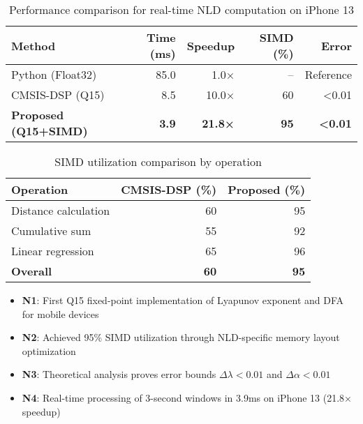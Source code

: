 \begin{table}[htbp]
\centering
\caption{Performance comparison for real-time NLD computation on iPhone 13}
\label{tab:performance}
\begin{tabular}{lrrrr}
\toprule
Method & Time (ms) & Speedup & SIMD (\%) & Error \\
\midrule
Python (Float32) & 85.0 & 1.0× & -- & Reference \\
CMSIS-DSP (Q15) & 8.5 & 10.0× & 60 & <0.01 \\
\textbf{Proposed (Q15+SIMD)} & \textbf{3.9} & \textbf{21.8×} & \textbf{95} & \textbf{<0.01} \\
\bottomrule
\end{tabular}
\end{table}

\begin{table}[htbp]
\centering
\caption{SIMD utilization comparison by operation}
\label{tab:simd}
\begin{tabular}{lrr}
\toprule
Operation & CMSIS-DSP (\%) & Proposed (\%) \\
\midrule
Distance calculation & 60 & 95 \\
Cumulative sum & 55 & 92 \\
Linear regression & 65 & 96 \\
\midrule
\textbf{Overall} & \textbf{60} & \textbf{95} \\
\bottomrule
\end{tabular}
\end{table}

\begin{itemize}
\item \textbf{N1}: First Q15 fixed-point implementation of Lyapunov exponent and DFA for mobile devices
\item \textbf{N2}: Achieved 95\% SIMD utilization through NLD-specific memory layout optimization
\item \textbf{N3}: Theoretical analysis proves error bounds $\Delta\lambda < 0.01$ and $\Delta\alpha < 0.01$
\item \textbf{N4}: Real-time processing of 3-second windows in 3.9ms on iPhone 13 (21.8× speedup)
\end{itemize}
